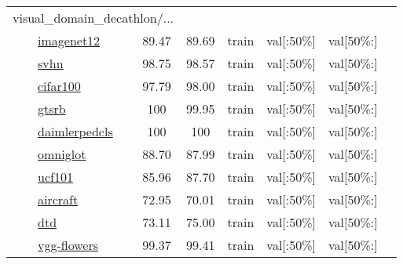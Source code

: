 \documentclass{article} \usepackage{iclr2023_conference,times}
\begin{document}
\begin{table*}[h]
\begin{tabular}{lcccccc}
\multicolumn{2}{l}{
visual\_domain\_decathlon/...
}
&
\\
\ \ \ \ \href{https://www.tensorflow.org/datasets/catalog/visual_domain_decathlon#visual_domain_decathlonimagenet12}{imagenet12}
&  89.47  &  89.69
& train & val[{\tiny:50\%}] & val[{\tiny50\%:}]
& \citep{hakanbilensylvestrerebuffitomasjakab2017}
\\
\ \ \ \ \href{https://www.tensorflow.org/datasets/catalog/visual_domain_decathlon#visual_domain_decathlonsvhn}{svhn}
&  98.75  &  98.57
& train & val[{\tiny:50\%}] & val[{\tiny50\%:}]
& \citep{hakanbilensylvestrerebuffitomasjakab2017}
\\
\ \ \ \ \href{https://www.tensorflow.org/datasets/catalog/visual_domain_decathlon#visual_domain_decathloncifar100}{cifar100}
&  97.79  &  98.00
& train & val[{\tiny:50\%}] & val[{\tiny50\%:}]
& \citep{hakanbilensylvestrerebuffitomasjakab2017}
\\
\ \ \ \ \href{https://www.tensorflow.org/datasets/catalog/visual_domain_decathlon#visual_domain_decathlongtsrb}{gtsrb}
&  100  &  99.95
& train & val[{\tiny:50\%}] & val[{\tiny50\%:}]
& \citep{hakanbilensylvestrerebuffitomasjakab2017}
\\
\ \ \ \ \href{https://www.tensorflow.org/datasets/catalog/visual_domain_decathlon#visual_domain_decathlondaimlerpedcls}{daimlerpedcls}
&  100  &  100
& train & val[{\tiny:50\%}] & val[{\tiny50\%:}]
& \citep{hakanbilensylvestrerebuffitomasjakab2017}
\\
\ \ \ \ \href{https://www.tensorflow.org/datasets/catalog/visual_domain_decathlon#visual_domain_decathlonomniglot}{omniglot}
&  88.70  &  87.99
& train & val[{\tiny:50\%}] & val[{\tiny50\%:}]
& \citep{hakanbilensylvestrerebuffitomasjakab2017}
\\
\ \ \ \ \href{https://www.tensorflow.org/datasets/catalog/visual_domain_decathlon#visual_domain_decathlonucf101}{ucf101}
&  85.96  &  87.70
& train & val[{\tiny:50\%}] & val[{\tiny50\%:}]
& \citep{hakanbilensylvestrerebuffitomasjakab2017}
\\
\ \ \ \ \href{https://www.tensorflow.org/datasets/catalog/visual_domain_decathlon#visual_domain_decathlonaircraft_default_config}{aircraft}
&  72.95  &  70.01
& train & val[{\tiny:50\%}] & val[{\tiny50\%:}]
& \citep{hakanbilensylvestrerebuffitomasjakab2017}
\\
\ \ \ \ \href{https://www.tensorflow.org/datasets/catalog/visual_domain_decathlon#visual_domain_decathlondtd}{dtd}
&  73.11  &  75.00
& train & val[{\tiny:50\%}] & val[{\tiny50\%:}]
& \citep{hakanbilensylvestrerebuffitomasjakab2017}
\\
\ \ \ \ \href{https://www.tensorflow.org/datasets/catalog/visual_domain_decathlon#visual_domain_decathlonvgg-flowers}{vgg-flowers}
&  99.37  &  99.41
& train & val[{\tiny:50\%}] & val[{\tiny50\%:}]
& \citep{hakanbilensylvestrerebuffitomasjakab2017}
\\
\midrule


\end{tabular}
\end{table*}
\end{document}
